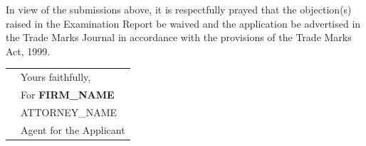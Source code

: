 \documentclass[12pt,a4paper]{article}
\begin{document}

\noindent
In view of the submissions above, it is respectfully prayed that the objection(s)
raised in the Examination Report be waived and the application be advertised in
the Trade Marks Journal in accordance with the provisions of the Trade Marks
Act, 1999.

\vspace{6mm}

\noindent
\begin{tabular}{@{}L{9cm}L{6cm}@{}}
  & {\small Yours faithfully,} \\[10pt]
  & {\small For \textbf{{{FIRM_NAME}}}} \\[18pt]
  & {\small {{ATTORNEY_NAME}}} \\
  & {\footnotesize Agent for the Applicant} \\
\end{tabular}
\end{document}
